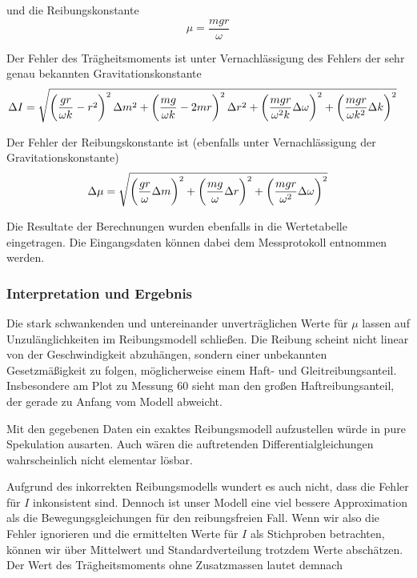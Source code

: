 \documentclass[a4paper,german,12pt,smallheadings]{scrartcl}
\begin{document}
und die Reibungskonstante
\begin{equation}
  \mu = \frac{mgr}{\omega}
\end{equation}

Der Fehler des Trägheitsmoments ist unter Vernachlässigung des Fehlers der sehr
genau bekannten Gravitationskonstante %
\begin{align*}
  \Delta I
  &= \sqrt{
  \del{\frac{gr}{\omega k} - r^2}^2 \Delta m^2 +
  \del{\frac{mg}{\omega k} - 2mr}^2 \Delta r^2 +
  \del{\frac{mgr}{\omega^2k} \Delta \omega}^2 +
  \del{\frac{mgr}{\omega k^2} \Delta k}^2
  }
\end{align*}

Der Fehler der Reibungskonstante ist (ebenfalls unter Vernachlässigung der
Gravitationskonstante)
\begin{equation}
  \Delta \mu = \sqrt{
    \del{\frac{gr}{\omega} \Delta m}^2 +
    \del{\frac{mg}{\omega} \Delta r}^2 +
    \del{\frac{mgr}{\omega^2} \Delta \omega}^2
  }
\end{equation}

Die Resultate der Berechnungen wurden ebenfalls in die Wertetabelle
eingetragen. Die Eingangsdaten können dabei dem Messprotokoll entnommen werden.

\subsubsection{Interpretation und Ergebnis}
Die stark schwankenden und untereinander unverträglichen Werte für $\mu$ lassen
auf Unzulänglichkeiten im Reibungsmodell schließen. Die Reibung scheint nicht
linear von der Geschwindigkeit abzuhängen, sondern einer unbekannten
Gesetzmäßigkeit zu folgen, möglicherweise einem Haft- und Gleitreibungsanteil.
Insbesondere am Plot zu Messung 60 sieht man den großen Haftreibungsanteil,
der gerade zu Anfang vom Modell abweicht.

Mit den gegebenen Daten ein exaktes Reibungsmodell aufzustellen würde in pure
Spekulation ausarten. Auch wären die auftretenden Differentialgleichungen
wahrscheinlich nicht elementar lösbar.

Aufgrund des inkorrekten Reibungsmodells wundert es auch nicht, dass die Fehler
für $I$ inkonsistent sind. Dennoch ist unser Modell eine viel bessere
Approximation als die Bewegungsgleichungen für den reibungsfreien Fall. Wenn
wir also die Fehler ignorieren und die ermittelten Werte für $I$ als
Stichproben betrachten, können wir über Mittelwert und Standardverteilung
trotzdem Werte abschätzen. Der Wert des Trägheitsmoments ohne Zusatzmassen
lautet demnach
\end{document}
